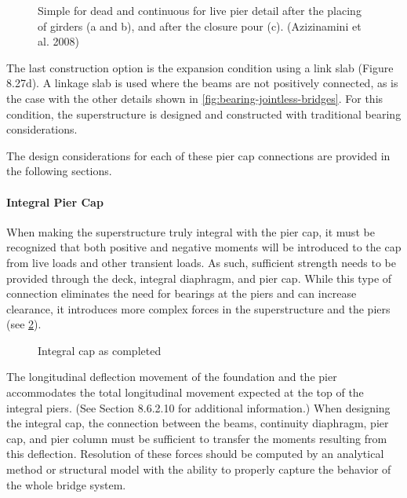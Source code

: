 \begin{figure}
  \caption{Simple for dead and continuous for live pier detail after the placing of girders (a and b), and after the closure pour (c). (Azizinamini et al. 2008)}
  \label{fig:sdcl-details}
\end{figure}

The last construction option is the expansion condition using a link slab (Figure 8.27d). A linkage slab is used
where the beams are not positively connected, as is the case with the other details shown in \cref{fig:bearing-jointless-bridges}. For this
condition, the superstructure is designed and constructed with traditional bearing considerations.

The design considerations for each of these pier cap connections are provided in the following sections.

\paragraph{Integral Pier Cap}

When making the superstructure truly integral with the pier cap, it must be recognized that both positive and
negative moments will be introduced to the cap from live loads and other transient loads. As such, sufficient strength
needs to be provided through the deck, integral diaphragm, and pier cap. While this type of connection eliminates the
need for bearings at the piers and can increase clearance, it introduces more complex forces in the superstructure and
the piers (see \cref{fig:integral-cap-completed}).

\begin{figure}
  \caption{Integral cap as completed}
  \label{fig:integral-cap-completed}
\end{figure}

The longitudinal deflection movement of the foundation and the pier accommodates the total longitudinal
movement expected at the top of the integral piers. (See Section 8.6.2.10 for additional information.) When designing
the integral cap, the connection between the beams, continuity diaphragm, pier cap, and pier column must be
sufficient to transfer the moments resulting from this deflection. Resolution of these forces should be computed by an
analytical method or structural model with the ability to properly capture the behavior of the whole bridge system.

